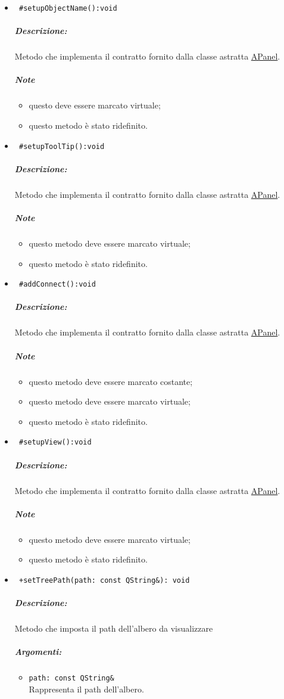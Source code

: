 \begin{itemize}
\item\color{blue}\verb! #setupObjectName():void!
\color{black}
\subparagraph{Descrizione:} Metodo che implementa il contratto fornito dalla classe astratta \hyperref[speAPanel]{APanel}.
 \subparagraph{Note}
 \begin{itemize}
  \item questo deve essere marcato virtuale;
 \item questo metodo è stato ridefinito.
 \end{itemize}
 
\item\color{blue}\verb! #setupToolTip():void!
\color{black}
\subparagraph{Descrizione:} Metodo che implementa il contratto fornito dalla classe astratta \hyperref[speAPanel]{APanel}.
 \subparagraph{Note}
 \begin{itemize}
 \item questo metodo deve essere marcato virtuale;
 \item questo metodo è stato ridefinito.
 \end{itemize}
 
\item\color{blue}\verb! #addConnect():void!
\color{black}
\subparagraph{Descrizione:} Metodo che implementa il contratto fornito dalla classe astratta \hyperref[speAPanel]{APanel}.
 \subparagraph{Note}
 \begin{itemize}
 \item questo metodo deve essere marcato costante;
 \item questo metodo deve essere marcato virtuale;
 \item questo metodo è stato ridefinito.
 \end{itemize}
 
\item\color{blue}\verb! #setupView():void!
\color{black}
\subparagraph{Descrizione:} Metodo che implementa il contratto fornito dalla classe astratta \hyperref[speAPanel]{APanel}.
 \subparagraph{Note}
 \begin{itemize}
 \item questo metodo deve essere marcato virtuale;
 \item questo metodo è stato ridefinito.
 \end{itemize}
 
\item\color{blue}\verb! +setTreePath(path: const QString&): void!
\color{black}
\subparagraph{Descrizione:} Metodo che imposta il path dell'albero da visualizzare
\subparagraph{Argomenti:}
\begin{itemize}
\item \color{RoyalPurple} \verb!path: const QString& ! \\ Rappresenta il path dell'albero.
\end{itemize}


\end{itemize}
